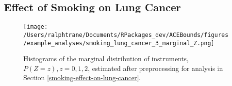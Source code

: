 \documentclass[
]{article}
\theoremstyle{plain}
\begin{document}
\hypertarget{effect-of-smoking-on-lung-cancer}{%
\subsection{\texorpdfstring{Effect of Smoking on Lung Cancer \label{appendix:smoking-on-lung-cancer}}{Effect of Smoking on Lung Cancer }}\label{effect-of-smoking-on-lung-cancer}}

\begin{figure}[H]
  \center
  \texttt{[image: /Users/ralphtrane/Documents/RPackages\_dev/ACEBounds/figures/example\_analyses/smoking\_lung\_cancer\_3\_marginal\_Z.png]}
  \caption{Histograms of the marginal distribution of instruments, $P(Z = z), z=0,1,2$, estimated after preprocessing for analysis in Section \ref{smoking-effect-on-lung-cancer}.}
  \label{fig:marginal-distribution-of-instruments-lung-cancer}
\end{figure}
\end{document}
